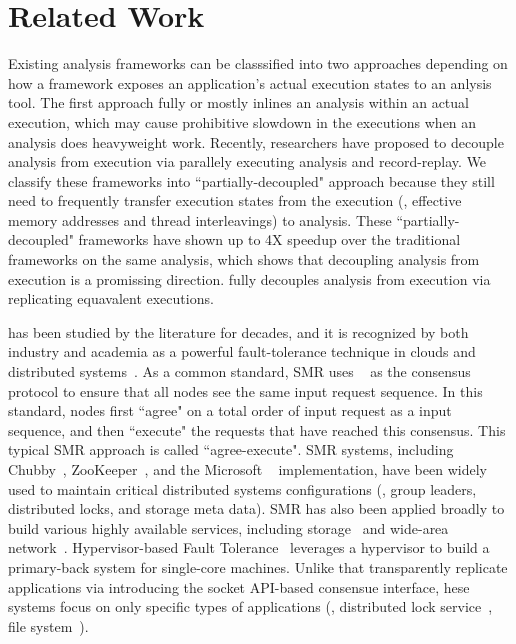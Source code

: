 \section{Related Work} \label{sec:related}

Existing analysis frameworks can be classsified into two approaches depending 
on how a framework exposes an application's actual execution states to an 
anlysis tool. The first approach fully or mostly inlines an analysis within an 
actual execution, which may cause prohibitive slowdown in the executions when 
an analysis does heavyweight work. Recently, researchers have proposed to 
decouple analysis from execution via parallely executing analysis and 
record-replay. We classify these frameworks into ``partially-decoupled" 
approach because they still need to frequently transfer execution states from 
the execution (\eg, effective memory addresses and thread interleavings) to 
analysis. These ``partially-decoupled" frameworks have shown up to 4X speedup 
over the traditional frameworks on the same analysis, which shows that 
decoupling analysis from execution is a promissing direction. \xxx fully 
decouples analysis from execution via replicating equavalent executions.

\smr has been studied by the literature for decades, and it is recognized by 
both industry and academia as a powerful fault-tolerance technique in clouds 
and distributed systems~\cite{lamportclock, smr:tutorial}. As a common 
standard, SMR uses \paxos~\cite{paxos} as the consensus protocol to ensure that 
all nodes see the same input request sequence. In this standard, nodes first 
``agree" on a total order of input request as a input sequence, and then 
``execute" the requests that have reached this consensus. This typical SMR 
approach is called ``agree-execute". SMR systems, including 
Chubby~\cite{chubby:osdi}, ZooKeeper~\cite{zookeeper}, and 
the Microsoft \paxos~\cite{paxos} implementation, have been widely used to 
maintain critical distributed systems configurations (\eg, group leaders, 
distributed locks, and storage meta data). SMR has also been applied broadly to 
build various highly available services, including 
storage~\cite{paxos:datastore} and wide-area network~\cite{mencius:osdi08}. 
Hypervisor-based Fault Tolerance~\cite{hft:sosp95} leverages a hypervisor to 
build a primary-back system for single-core machines. Unlike \xxx that 
transparently replicate applications via introducing the socket API-based 
consensue interface, hese systems focus on only specific types of applications 
(\eg, distributed lock service~\cite{chubby:osdi}, file 
system~\cite{zookeeper}).

